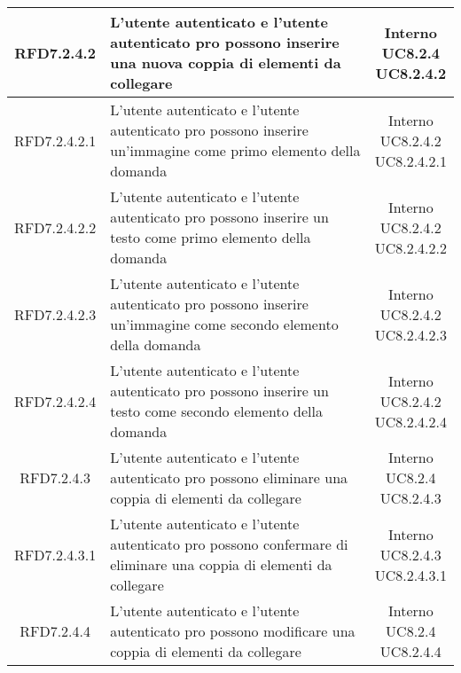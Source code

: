 \begin{longtable}{|c|>{\centering}m{7cm}|c|}
			 \hypertarget{{RFD7.2.4.2}}{{RFD7.2.4.2}} & L’utente autenticato e l’utente
autenticato pro possono inserire una
nuova coppia di elementi da collegare & \makecell{Interno\\ UC8.2.4 \\UC8.2.4.2 } \\ \hline
			 \hypertarget{{RFD7.2.4.2.1}}{{RFD7.2.4.2.1}} & L’utente autenticato e l’utente
autenticato pro possono inserire
un’immagine come primo elemento della
domanda & \makecell{Interno\\ UC8.2.4.2 \\UC8.2.4.2.1 } \\ \hline
			 \hypertarget{{RFD7.2.4.2.2}}{{RFD7.2.4.2.2}} & L’utente autenticato e l’utente
autenticato pro possono inserire un testo
come primo elemento della domanda & \makecell{Interno\\ UC8.2.4.2 \\UC8.2.4.2.2 } \\ \hline
			 \hypertarget{{RFD7.2.4.2.3}}{{RFD7.2.4.2.3}} & L’utente autenticato e l’utente
autenticato pro possono inserire
un’immagine come secondo elemento
della domanda & \makecell{Interno\\ UC8.2.4.2 \\UC8.2.4.2.3 } \\ \hline
			 \hypertarget{{RFD7.2.4.2.4}}{{RFD7.2.4.2.4}} & L’utente autenticato e l’utente
autenticato pro possono inserire un testo
come secondo elemento della domanda & \makecell{Interno\\ UC8.2.4.2 \\UC8.2.4.2.4 } \\ \hline
			 \hypertarget{{RFD7.2.4.3}}{{RFD7.2.4.3}} & L’utente autenticato e l’utente
autenticato pro possono eliminare una
coppia di elementi da collegare & \makecell{Interno\\ UC8.2.4 \\UC8.2.4.3 } \\ \hline
			 \hypertarget{{RFD7.2.4.3.1}}{{RFD7.2.4.3.1}} & L’utente autenticato e l’utente
autenticato pro possono confermare di
eliminare una coppia di elementi da
collegare & \makecell{Interno\\ UC8.2.4.3 \\UC8.2.4.3.1 } \\ \hline
			 \hypertarget{{RFD7.2.4.4}}{{RFD7.2.4.4}} & L’utente autenticato e l’utente
autenticato pro possono modificare una
coppia di elementi da collegare & \makecell{Interno\\ UC8.2.4 \\UC8.2.4.4 } \\ \hline

\end{longtable}
